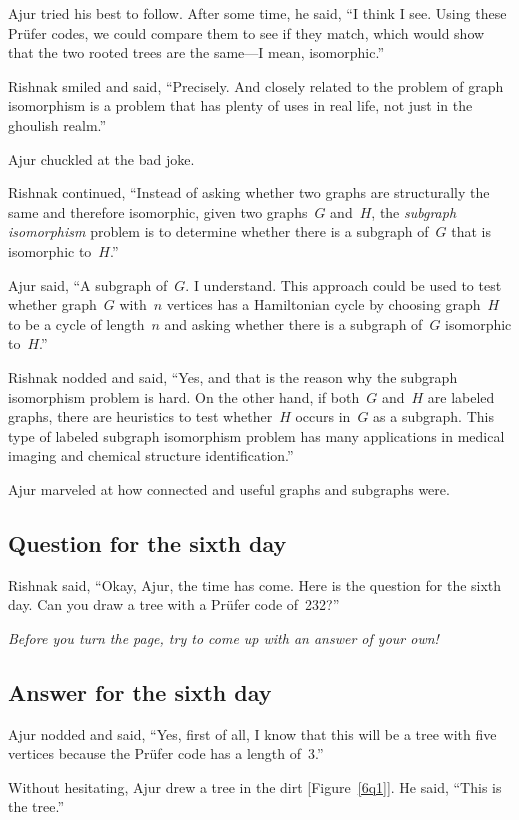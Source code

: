 Ajur tried his best to follow. After some time, he said, ``I think I see. Using these Pr\"ufer codes, we could compare them to see if they match, which would show that the two rooted trees are the same---I mean, isomorphic.''

Rishnak smiled and said, ``Precisely. And closely related to the problem of graph isomorphism is a problem that has plenty of uses in real life, not just in the ghoulish realm.''

Ajur chuckled at the bad joke.

Rishnak continued, ``Instead of asking whether two graphs are structurally the same and therefore isomorphic, given two graphs~$G$ and~$H$, the \textit{subgraph isomorphism} problem is to determine whether there is a subgraph of~$G$ that is isomorphic to~$H$.''

Ajur said, ``A subgraph of~$G$. I understand. This approach could be used to test whether graph~$G$ with~$n$ vertices has a Hamiltonian cycle by choosing graph~$H$ to be a cycle of length~$n$ and asking whether there is a subgraph of~$G$ isomorphic to~$H$.'' 

Rishnak nodded and said, ``Yes, and that is the reason why the subgraph isomorphism problem is hard. On the other hand, if both~$G$ and~$H$ are labeled graphs, there are heuristics to test whether~$H$ occurs in~$G$ as a subgraph. This type of labeled subgraph isomorphism problem has many applications in medical imaging and chemical structure identification.''

Ajur marveled at how connected and useful graphs and subgraphs were.

\subsection*{Question for the sixth day}
Rishnak said, ``Okay, Ajur, the time has come. Here is the question for the sixth day. Can you draw a tree with a Pr{\"u}fer code of~232?''

\textit{Before you turn the page, try to come up with an answer of your own!}

\newpage
\subsection*{Answer for the sixth day}
Ajur nodded and said, ``Yes, first of all, I know that this will be a tree with five vertices because the Pr\"ufer code has a length of~3.''

Without hesitating, Ajur drew a tree in the dirt [Figure~\ref{6q1}].  He said, ``This is the tree.''

